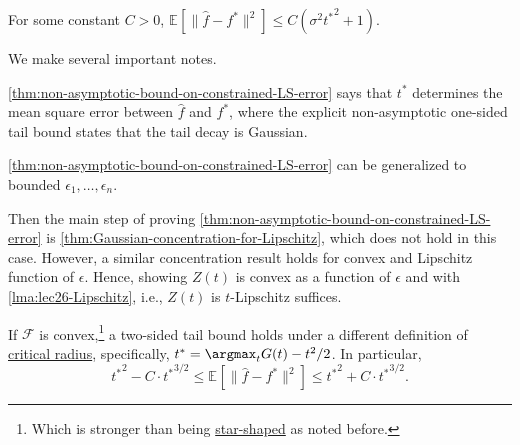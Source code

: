 \begin{remark}
	For some constant \(C > 0\), \(\mathbb{E}_{}[ \lVert \hat{f} - f^{\ast} \rVert ^2 ] \leq C (\sigma ^2 {t^{\ast} }^2 + 1)\).
\end{remark}

We make several important notes.

\begin{note}
	\autoref{thm:non-asymptotic-bound-on-constrained-LS-error} says that \(t^{\ast} \) determines the mean square error between \(\hat{f} \) and \(f^{\ast} \), where the explicit non-asymptotic one-sided tail bound states that the tail decay is Gaussian.
\end{note}

\begin{note}
	\autoref{thm:non-asymptotic-bound-on-constrained-LS-error} can be generalized to bounded \(\epsilon _1, \dots , \epsilon _n \).
\end{note}
\begin{explanation}
	Then the main step of proving \autoref{thm:non-asymptotic-bound-on-constrained-LS-error} is \autoref{thm:Gaussian-concentration-for-Lipschitz}, which does not hold in this case. However, a similar concentration result holds for convex and Lipschitz function of \(\epsilon \). Hence, showing \(Z(t)\) is convex as a function of \(\epsilon \) and with \autoref{lma:lec26-Lipschitz}, i.e., \(Z(t)\) is \(t\)-Lipschitz suffices.
\end{explanation}

\begin{remark}
	If \(\mathscr{F} \) is convex,\footnote{Which is stronger than being \hyperref[def:star-shaped]{star-shaped} as noted before.} a two-sided tail bound holds under a different definition of \hyperref[def:critical-radius]{critical radius}, specifically, \(t^{\ast} = \argmax_{t} G(t) - t^2 / 2\). In particular,
	\[
		{t^{\ast} }^2 - C\cdot {t^{\ast} }^{3 / 2}
		\leq \mathbb{E}_{}\left[ \lVert \hat{f} - f^{\ast} \rVert ^2 \right]
		\leq {t^{\ast} }^2 + C\cdot {t^{\ast} }^{3 / 2}.
	\]
\end{remark}
